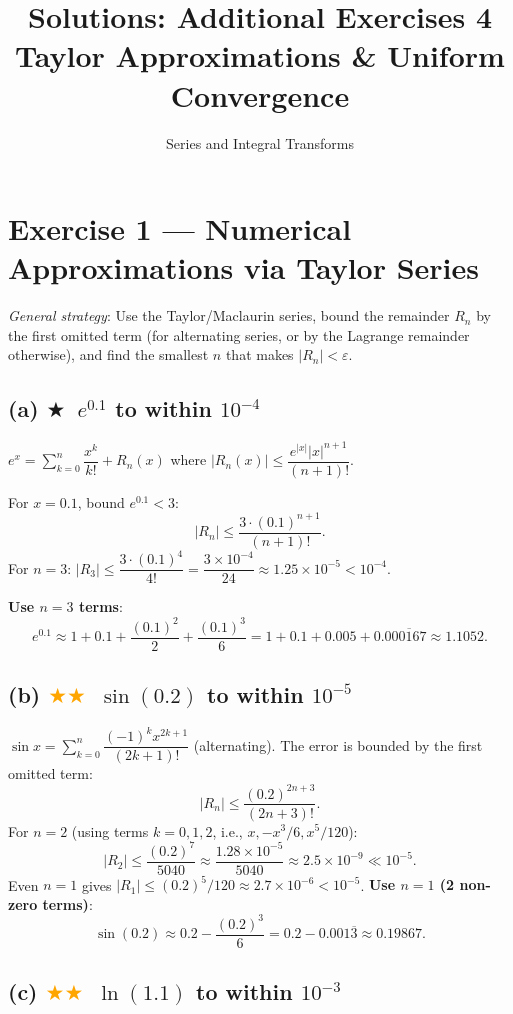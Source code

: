 \documentclass[12pt,a4paper]{article}
\title{\textbf{Solutions: Additional Exercises 4}\\Taylor Approximations \& Uniform Convergence}
\author{Series and Integral Transforms}
\date{}
\newcommand{\easy}{\textcolor{green!60!black}{$\bigstar$}}
\newcommand{\medium}{\textcolor{orange}{$\bigstar\bigstar$}}
\begin{document}
\maketitle

\section*{Exercise 1 — Numerical Approximations via Taylor Series}

\textit{General strategy}: Use the Taylor/Maclaurin series, bound the remainder $R_n$ by the first omitted term (for alternating series, or by the Lagrange remainder otherwise), and find the smallest $n$ that makes $|R_n|<\varepsilon$.

\subsection*{(a) \easy\ $e^{0.1}$ to within $10^{-4}$}

$e^x = \sum_{k=0}^{n}\dfrac{x^k}{k!} + R_n(x)$ where $|R_n(x)|\leq \dfrac{e^{|x|}|x|^{n+1}}{(n+1)!}$.

For $x=0.1$, bound $e^{0.1}<3$:
\[
  |R_n|\leq \frac{3\cdot(0.1)^{n+1}}{(n+1)!}.
\]
For $n=3$: $|R_3|\leq \dfrac{3\cdot(0.1)^4}{4!}=\dfrac{3\times10^{-4}}{24}\approx 1.25\times10^{-5}<10^{-4}$.

\textbf{Use $n=3$ terms}:
\[
  e^{0.1}\approx 1+0.1+\frac{(0.1)^2}{2}+\frac{(0.1)^3}{6}
  = 1+0.1+0.005+0.000\overline{1}67
  \approx \mathbf{1.1052}.
\]

\subsection*{(b) \medium\ $\sin(0.2)$ to within $10^{-5}$}

$\sin x = \sum_{k=0}^{n}\dfrac{(-1)^k x^{2k+1}}{(2k+1)!}$ (alternating).  The error is bounded by the first omitted term:
\[
  |R_n| \leq \frac{(0.2)^{2n+3}}{(2n+3)!}.
\]
For $n=2$ (using terms $k=0,1,2$, i.e., $x, -x^3/6, x^5/120$):
\[
  |R_2|\leq\frac{(0.2)^7}{5040}\approx\frac{1.28\times10^{-5}}{5040}\approx2.5\times10^{-9}\ll10^{-5}.
\]
Even $n=1$ gives $|R_1|\leq(0.2)^5/120\approx 2.7\times10^{-6}<10^{-5}$.  \textbf{Use $n=1$ (2 non-zero terms)}:
\[
  \sin(0.2)\approx 0.2 - \frac{(0.2)^3}{6}
  = 0.2 - 0.001\overline{3}
  \approx \mathbf{0.19867}.
\]

\subsection*{(c) \medium\ $\ln(1.1)$ to within $10^{-3}$}
\end{document}
